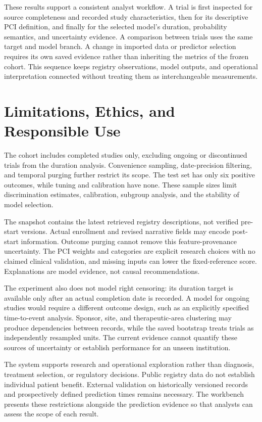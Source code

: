 \documentclass[10pt,letterpaper,twocolumn]{article}
\begin{document}
These results support a consistent analyst workflow. A trial is first inspected for source completeness and recorded study characteristics, then for its descriptive PCI definition, and finally for the selected model's duration, probability semantics, and uncertainty evidence. A comparison between trials uses the same target and model branch. A change in imported data or predictor selection requires its own saved evidence rather than inheriting the metrics of the frozen cohort. This sequence keeps registry observations, model outputs, and operational interpretation connected without treating them as interchangeable measurements.

\section{Limitations, Ethics, and Responsible Use}

The cohort includes completed studies only, excluding ongoing or discontinued trials from the duration analysis. Convenience sampling, date-precision filtering, and temporal purging further restrict its scope. The test set has only six positive outcomes, while tuning and calibration have none. These sample sizes limit discrimination estimates, calibration, subgroup analysis, and the stability of model selection.

The snapshot contains the latest retrieved registry descriptions, not verified pre-start versions. Actual enrollment and revised narrative fields may encode post-start information. Outcome purging cannot remove this feature-provenance uncertainty. The PCI weights and categories are explicit research choices with no claimed clinical validation, and missing inputs can lower the fixed-reference score. Explanations are model evidence, not causal recommendations.

The experiment also does not model right censoring: its duration target is available only after an actual completion date is recorded. A model for ongoing studies would require a different outcome design, such as an explicitly specified time-to-event analysis. Sponsor, site, and therapeutic-area clustering may produce dependencies between records, while the saved bootstrap treats trials as independently resampled units. The current evidence cannot quantify these sources of uncertainty or establish performance for an unseen institution.

The system supports research and operational exploration rather than diagnosis, treatment selection, or regulatory decisions. Public registry data do not establish individual patient benefit. External validation on historically versioned records and prospectively defined prediction times remains necessary. The workbench presents these restrictions alongside the prediction evidence so that analysts can assess the scope of each result.
\end{document}
